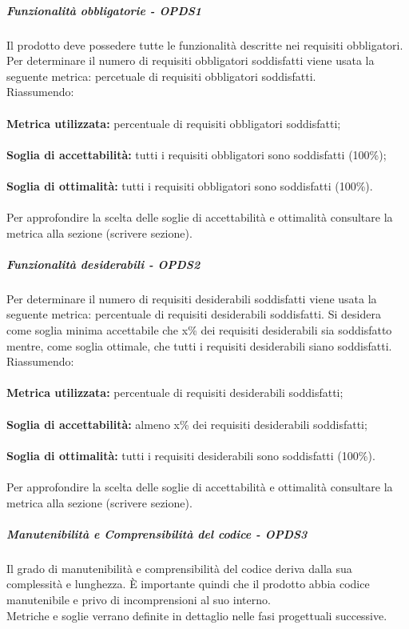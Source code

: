 \documentclass[PianoDiQualifica.tex]{subfiles}
\begin{document}
				\subparagraph{Funzionalità obbligatorie - OPDS1}
				Il prodotto deve possedere tutte le funzionalità descritte nei requisiti obbligatori. Per determinare il numero di requisiti obbligatori soddisfatti viene usata la
				seguente metrica: percetuale di requisiti obbligatori soddisfatti. \\
				Riassumendo: \\ \\
				\textbf{Metrica utilizzata:} percentuale di requisiti obbligatori soddisfatti;\\ \\
				\textbf{Soglia di accettabilità:} tutti i requisiti obbligatori sono soddisfatti (100\%); \\ \\
				\textbf{Soglia di ottimalità:} tutti i requisiti obbligatori sono soddisfatti (100\%). \\ \\
				Per approfondire la scelta delle soglie di accettabilità e ottimalità consultare la metrica alla sezione (scrivere sezione).
				
				\subparagraph{Funzionalità desiderabili - OPDS2}
				Per determinare il numero di requisiti desiderabili soddisfatti viene usata la seguente metrica: percentuale di requisiti desiderabili soddisfatti. Si desidera come soglia
				minima accettabile che x\% dei requisiti desiderabili sia soddisfatto mentre, come soglia ottimale, che tutti i requisiti desiderabili siano soddisfatti. \\
				Riassumendo: \\ \\
				\textbf{Metrica utilizzata:} percentuale di requisiti desiderabili soddisfatti;\\ \\
				\textbf{Soglia di accettabilità:} almeno x\% dei requisiti desiderabili soddisfatti; \\ \\
				\textbf{Soglia di ottimalità:} tutti i requisiti desiderabili sono soddisfatti (100\%). \\ \\
				Per approfondire la scelta delle soglie di accettabilità e ottimalità consultare la metrica alla sezione (scrivere sezione).
				
				\subparagraph{Manutenibilità e Comprensibilità del codice - OPDS3}
				Il grado di manutenibilità e comprensibilità del codice deriva dalla sua complessità e lunghezza. È importante quindi che il prodotto abbia codice manutenibile e
				privo di incomprensioni al suo interno. \\
				Metriche e soglie verrano definite in dettaglio nelle fasi progettuali successive.
				
\end{document}
